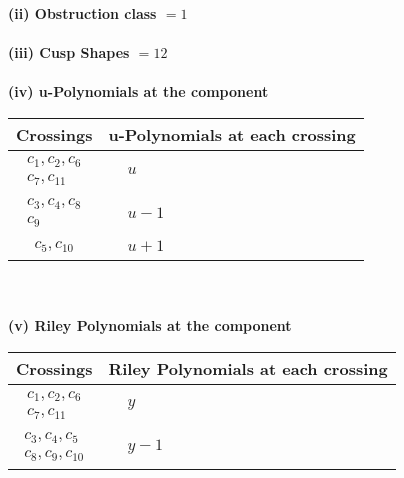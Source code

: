 \documentclass[1p]{elsarticle_modified}
\theoremstyle{definition}
\begin{document}
\flushleft \textbf{(ii) Obstruction class $= 1$}\\~\\
\flushleft \textbf{(iii) Cusp Shapes $= 12$}\\~\\
\newpage\renewcommand{\arraystretch}{1}
\flushleft \textbf{(iv) u-Polynomials at the component}\newline \\
\begin{tabular}{m{50pt}|m{274pt}}
Crossings & \hspace{64pt}u-Polynomials at each crossing \\
\hline $$\begin{aligned}c_{1},c_{2},c_{6}\\c_{7},c_{11}\end{aligned}$$&$\begin{aligned}
&u
\end{aligned}$\\
\hline $$\begin{aligned}c_{3},c_{4},c_{8}\\c_{9}\end{aligned}$$&$\begin{aligned}
&u-1
\end{aligned}$\\
\hline $$\begin{aligned}c_{5},c_{10}\end{aligned}$$&$\begin{aligned}
&u+1
\end{aligned}$\\
\hline
\end{tabular}\\~\\
\newpage\renewcommand{\arraystretch}{1}
\flushleft \textbf{(v) Riley Polynomials at the component}\newline \\
\begin{tabular}{m{50pt}|m{274pt}}
Crossings & \hspace{64pt}Riley Polynomials at each crossing \\
\hline $$\begin{aligned}c_{1},c_{2},c_{6}\\c_{7},c_{11}\end{aligned}$$&$\begin{aligned}
&y
\end{aligned}$\\
\hline $$\begin{aligned}c_{3},c_{4},c_{5}\\c_{8},c_{9},c_{10}\end{aligned}$$&$\begin{aligned}
&y-1
\end{aligned}$\\
\hline
\end{tabular}\\~\\
\end{document}
